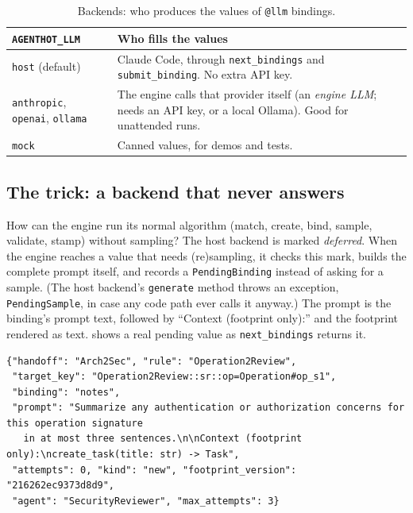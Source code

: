 \documentclass[10pt,a4paper]{article}
\newcommand{\cc}{Claude Code}
\newcommand{\code}[1]{\texttt{#1}}
\newcommand{\mcptool}[1]{\texttt{#1}}
\begin{document}
\begin{table}[!htb]
\centering\small
\caption{Backends: who produces the values of \code{@llm} bindings.}
\label{tab:backends}
\begin{tabularx}{\textwidth}{@{}l Y@{}}
\toprule
\code{AGENTHOT\_LLM} & Who fills the values \\
\midrule
\code{host} (default) & \cc{}, through \mcptool{next\_bindings} and \mcptool{submit\_binding}. No extra API key. \\
\code{anthropic}, \code{openai}, \code{ollama} & The engine calls that provider itself (an \emph{engine LLM}; needs an API key, or a local Ollama). Good for unattended runs. \\
\code{mock} & Canned values, for demos and tests. \\
\bottomrule
\end{tabularx}
\end{table}

\subsection{The trick: a backend that never answers}\label{sec:host-why}

How can the engine run its normal algorithm (match, create, bind, sample,
validate, stamp) without sampling? The host backend is marked
\emph{deferred}. When the engine reaches a value that needs (re)sampling, it
checks this mark, builds the complete prompt itself, and records a
\code{PendingBinding} instead of asking for a sample. (The host backend's
\code{generate} method throws an exception, \code{PendingSample}, in case
any code path ever calls it anyway.) The prompt is the binding's prompt
text, followed by ``Context (footprint only):'' and the footprint rendered
as text.  shows a real pending value as
\mcptool{next\_bindings} returns it.

\begin{lstlisting}[style=engine, caption={Observed: one pending value, as returned by \code{next\_bindings} (from \Cref{sec:walk1}, Step 8).}, label={lst:pending}]
{"handoff": "Arch2Sec", "rule": "Operation2Review",
 "target_key": "Operation2Review::sr::op=Operation#op_s1",
 "binding": "notes",
 "prompt": "Summarize any authentication or authorization concerns for this operation signature
   in at most three sentences.\n\nContext (footprint only):\ncreate_task(title: str) -> Task",
 "attempts": 0, "kind": "new", "footprint_version": "216262ec9373d8d9",
 "agent": "SecurityReviewer", "max_attempts": 3}
\end{lstlisting}
\end{document}
